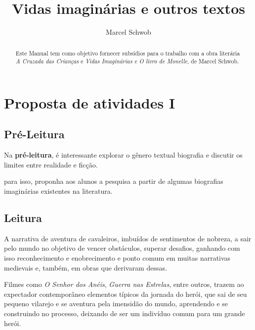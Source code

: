 \documentclass[12pt]{extarticle}
\begin{document}
\newcommand{\AutorLivro}{Marcel Schwob}
\newcommand{\TituloLivro}{Vidas imaginárias e outros textos}
\newcommand{\Tema}{Ficção, mistério e fantasia}
\newcommand{\Genero}{Conto, crônica e novela}
\newcommand{\imagemCapa}{./images/PNLD0036-01.png}
\newcommand{\issnppub}{---}
\newcommand{\issnepub}{---}
\newcommand{\colaborador}{\textbf{Fulano de Tal} é uma pessoa incrível e vai fazer um bom serviço.}


\title{\TituloLivro}
\author{\AutorLivro}
\def\authornotes{\colaborador}

\date{}
\maketitle


\begin{abstract}
Este Manual tem como objetivo fornecer subsídios para o trabalho com a
obra literária \emph{A Cruzada das Crianças} e \emph{Vidas Imaginárias e
O livro de Monelle}, de Marcel Schwob.
\end{abstract}


\tableofcontents

\section{Proposta de atividades I}

\subsection{Pré-Leitura}

Na \textbf{pré-leitura}, é interessante explorar o gênero
textual biografia e discutir os limites entre realidade e ficção.

para isso, proponha aos alunos a pesquisa a partir de algumas biografias
imaginárias existentes na literatura.


\subsection{Leitura}

A narrativa de aventura de cavaleiros, imbuídos de
sentimentos de nobreza, a sair pelo mundo no objetivo de vencer
obstáculos, superar desafios, ganhando com isso reconhecimento e
enobrecimento e ponto comum em muitas narrativas medievais e, também, em
obras que derivaram dessas.


Filmes como \emph{O Senhor dos Anéis}, \emph{Guerra nas Estrelas}, entre
outros, trazem ao expectador contemporâneo elementos típicos da jornada
do herói, que sai de seu pequeno vilarejo e se aventura pela imensidão
do mundo, aprendendo e se construindo no processo, deixando de ser um
indivíduo comum para um grande herói.
\end{document}
